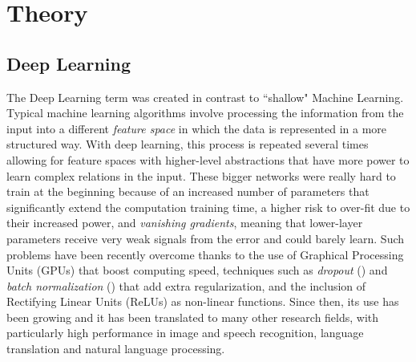 \chapter{Theory} \label{Chapter: Theory}




\section{Deep Learning}

The Deep Learning term was created in contrast to ``shallow" Machine Learning. Typical machine learning algorithms involve processing the information from the input into a different \textit{feature space} in which the data is represented in a more structured way. With deep learning, this process is repeated several times allowing for feature spaces with higher-level abstractions that have more power to learn complex relations in the input. These bigger networks were really hard to train at the beginning because of an increased number of parameters that significantly extend the computation training time, a higher risk to over-fit due to their increased power, and \textit{vanishing gradients}, meaning that lower-layer parameters receive very weak signals from the error and could barely learn. Such problems have been recently overcome thanks to the use of Graphical Processing Units (GPUs) that boost computing speed, techniques such as \textit{dropout} (\cite{Srivastava2014}) and \textit{batch normalization} (\cite{SergeyIoffe2015}) that add extra regularization, and the inclusion of Rectifying Linear Units (ReLUs) as non-linear functions. Since then, its use has been growing and it has been translated to many other research fields, with particularly high performance in image and speech recognition, language translation and natural language processing.

